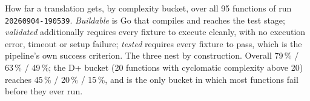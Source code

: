 \caption{How far a translation gets, by complexity bucket, over all 95
  functions of run \texttt{20260904-190539}. \emph{Buildable} is Go that compiles and
  reaches the test stage; \emph{validated} additionally requires every fixture to
  execute cleanly, with no execution error, timeout or setup failure;
  \emph{tested} requires every fixture to pass, which is the pipeline's own
  success criterion. The three nest by construction. Overall
  79\,\% / 63\,\% / 49\,\%; the D+ bucket (20 functions with
  cyclomatic complexity above 20) reaches 45\,\% / 20\,\% / 15\,\%,
  and is the only bucket in which most functions fail before they ever run.}
